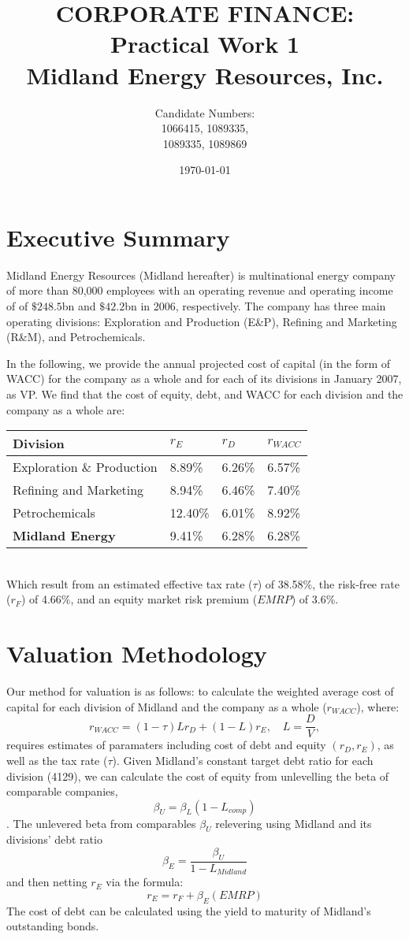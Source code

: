 \documentclass{article}
\title{CORPORATE FINANCE: \\Practical Work 1\\ Midland Energy Resources, Inc.}
\author{Candidate Numbers: \\1066415, 1089335, \\1089335, 1089869}
\date{\today}
\begin{document}
\maketitle

\newpage
\hrulefill
\section{Executive Summary}
Midland Energy Resources (Midland hereafter) is  multinational energy company of more than 80,000 employees with an operating revenue and operating income of of $\$248.5$bn and $\$42.2$bn in 2006, respectively. The company has three main operating divisions: Exploration and Production (E\&P), Refining and Marketing (R\&M), and Petrochemicals. 

In the following, we provide the annual projected cost of capital (in the form of WACC) for the company as a whole and for each of its divisions in January 2007, as VP.
We find that the cost of equity, debt, and WACC for each division and the company as a whole are:
\begin{table}[h]
    \centering
    \begin{tabular}{llll}
    \textbf{Division}                  & $r_E$    & $r_D$   & $r_{W\!ACC}$ \\ \hline
    Exploration \& Production & 8.89\%  & 6.26\% & 6.57\%  \\
    Refining and Marketing    & 8.94\%  & 6.46\% & 7.40\%  \\
    Petrochemicals            & 12.40\% & 6.01\% & 8.92\%  \\ \hline
    \textbf{Midland Energy}   & 9.41\%  & 6.28\% & 6.28\% 
    \end{tabular}
\end{table}\\
Which result from an estimated effective tax rate ($\tau$) of 38.58\%, the risk-free rate ($r_F$) of 4.66\%, and an equity market risk premium ($EMRP$) of 3.6\%.

\hrulefill
\section{Valuation Methodology}
Our method for valuation is as follows: to calculate the weighted average cost of capital for each division of Midland and the company as a whole ($r_{W\!ACC}$), where:
\[r_{W\!ACC} = (1 - \tau)Lr_{D} + (1-L)r_E, \quad L=\frac{D}{V},\]
requires estimates of paramaters including cost of debt and equity $(r_{D},r_{E})$, as well as the tax rate ($\tau$). Given Midland's constant target debt ratio for each division (4129), we can calculate the cost of equity from unlevelling the beta of comparable companies, 
$$\beta_U=\beta_L(1-L_{comp})$$
. The unlevered beta from comparables $\beta_U$ relevering using Midland and its divisions' debt ratio
$$\beta_E=\frac{\beta_U}{1-L_{Midland}}$$
and then netting $r_E$ via the formula:
$$r_E=r_F+\beta_E(EMRP)$$
The cost of debt can be calculated using the yield to maturity of Midland's outstanding bonds.
\end{document}
